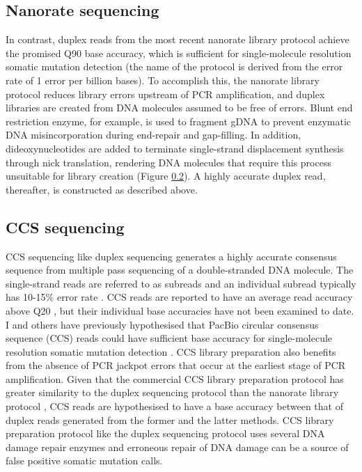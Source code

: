 \subsection{Nanorate sequencing}

In contrast, duplex reads from the most recent nanorate library protocol achieve the promised Q90 base accuracy, which is sufficient for single-molecule resolution somatic mutation detection \cite{Abascal2021-pk} (the name of the protocol is derived from the error rate of 1 error per billion bases). To accomplish this, the nanorate library protocol reduces library errors upstream of PCR amplification, and duplex libraries are created from DNA molecules assumed to be free of errors. Blunt end restriction enzyme, for example, is used to fragment gDNA to prevent enzymatic DNA misincorporation during end-repair and gap-filling. In addition, dideoxynucleotides are added to terminate single-strand displacement synthesis through nick translation, rendering DNA molecules that require this process unsuitable for library creation (Figure \ref{}). A highly accurate duplex read, thereafter, is constructed as described above.  

%

\subsection{CCS sequencing}

CCS sequencing like duplex sequencing generates a highly accurate consensus sequence from multiple pass sequencing of a double-stranded DNA molecule. The single-strand reads are referred to as subreads and an individual subread typically has 10-15\% error rate \cite{Chaisson2012-vr}. CCS reads are reported to have an average read accuracy above Q20 \cite{Wenger2019-pw}, but their individual base accuracies have not been examined to date. I and others have previously hypothesised that PacBio circular consensus sequence (CCS) reads could have sufficient base accuracy for single-molecule resolution somatic mutation detection \cite{Salk2018-cp}. CCS library preparation also benefits from the absence of PCR jackpot errors that occur at the earliest stage of PCR amplification. Given that the commercial CCS library preparation protocol has greater similarity to the duplex sequencing protocol \cite{Schmitt2012-yr} than the nanorate library protocol \cite{Abascal2021-pk}, CCS reads are hypothesised to have a base accuracy between that of duplex reads generated from the former and the latter methods. CCS library preparation protocol like the duplex sequencing protocol uses several DNA damage repair enzymes and erroneous repair of DNA damage can be a source of false positive somatic mutation calls. 

